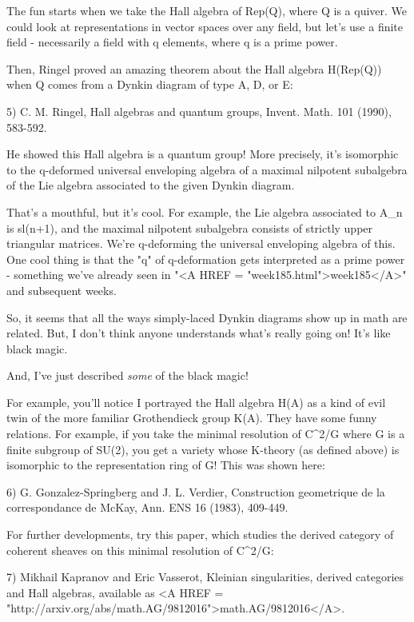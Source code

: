 The fun starts when we take the Hall algebra of Rep(Q), where
Q is a quiver.  We could look at representations in vector
spaces over any field, but let's use a finite field - necessarily 
a field with q elements, where q is a prime power.  

Then, Ringel proved an amazing theorem about the Hall algebra 
H(Rep(Q)) when Q comes from a Dynkin diagram of type A, D, or E:

5) C. M. Ringel, Hall algebras and quantum groups, Invent. Math. 101
(1990), 583-592.

He showed this Hall algebra is a quantum group!  More precisely, 
it's isomorphic to the q-deformed universal enveloping algebra 
of a maximal nilpotent subalgebra of the Lie algebra associated 
to the given Dynkin diagram.  

That's a mouthful, but it's cool.  For example, the Lie algebra 
associated to A_{n} is sl(n+1), and the maximal nilpotent subalgebra 
consists of strictly upper triangular matrices.   
We're q-deforming the universal enveloping algebra of this.  
One cool thing
is that the "q" of q-deformation gets interpreted
as a prime power - something we've already seen in "<A HREF = "week185.html">week185</A>" and subsequent weeks.

So, it seems that all the ways simply-laced Dynkin diagrams show
up in math are related.  But, I don't think anyone understands
what's really going on!  It's like black magic.  

And, I've just described \emph{some} of the black magic!  

For example, you'll notice I portrayed the Hall algebra H(A) 
as a kind of evil twin of the more familiar Grothendieck group K(A).  
They have some funny relations.  For example, if you take the minimal 
resolution of C^{2}/G where G is a finite subgroup of SU(2), you get a 
variety whose K-theory (as defined above) is isomorphic to the 
representation ring of G!  This was shown here:

6) G. Gonzalez-Springberg and J. L. Verdier, Construction geometrique
de la correspondance de McKay, Ann. ENS 16 (1983), 409-449.

For further developments, try this paper, which studies the derived 
category of coherent sheaves on this minimal resolution of C^{2}/G:

7) Mikhail Kapranov and Eric Vasserot, Kleinian singularities,
derived categories and Hall algebras, available as <A HREF = 
"http://arxiv.org/abs/math.AG/9812016">math.AG/9812016</A>.

